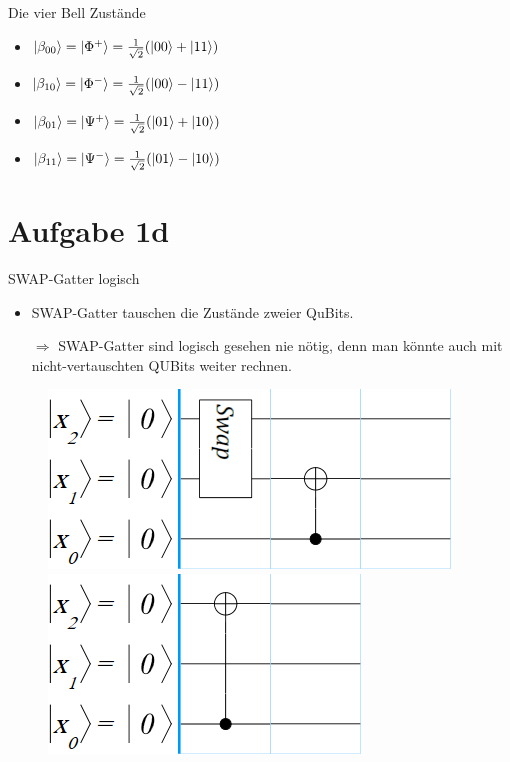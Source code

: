 \documentclass[fleqn,compress,utf8,aspectratio=169,t]{beamer}
\begin{document}
\begin{frame}{Die vier Bell Zustände}
\begin{itemize}
	\item $\ket{\beta_{00}} = \ket{\Phi^+} = \frac{1}{\sqrt{2}} (\ket{00} + \ket{11})$
	\item $\ket{\beta_{10}} = \ket{\Phi^-} = \frac{1}{\sqrt{2}} (\ket{00} - \ket{11})$
	\item $\ket{\beta_{01}} = \ket{\Psi^+} = \frac{1}{\sqrt{2}} (\ket{01} + \ket{10})$
	\item $\ket{\beta_{11}} = \ket{\Psi^-} = \frac{1}{\sqrt{2}} (\ket{01} - \ket{10})$
\end{itemize}
\end{frame}

\section{Aufgabe 1d}

\begin{frame}{SWAP-Gatter logisch}
\begin{itemize}
	\item SWAP-Gatter tauschen die Zustände zweier QuBits.
	\item[$\Rightarrow$] SWAP-Gatter sind logisch gesehen nie nötig, denn man könnte auch mit nicht-vertauschten QUBits weiter rechnen.
\end{itemize}

\begin{figure}
	\begin{minipage}{.5\textwidth}
		\centering
		\includegraphics[height=.3\textheight]{images/1d-mit-swap.png}
	\end{minipage}%
	\begin{minipage}{.5\textwidth}
		\centering
		\includegraphics[height=.3\textheight]{images/1d-ohne-swap.png}
	\end{minipage}
\end{figure}
\end{frame}
\end{document}
